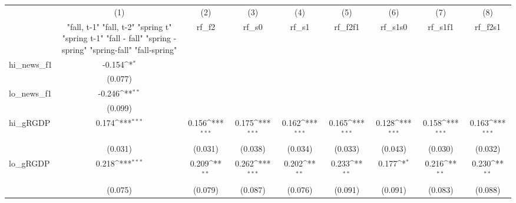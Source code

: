 {
\def\sym#1{\ifmmode^{#1}\else\(^{#1}\)\fi}
\begin{tabular}{l*{8}{c}}
\toprule
            &\multicolumn{1}{c}{(1)}&\multicolumn{1}{c}{(2)}&\multicolumn{1}{c}{(3)}&\multicolumn{1}{c}{(4)}&\multicolumn{1}{c}{(5)}&\multicolumn{1}{c}{(6)}&\multicolumn{1}{c}{(7)}&\multicolumn{1}{c}{(8)}\\
            &\multicolumn{1}{c}{  "fall, t-1" "fall, t-2" "spring t" "spring t-1"  "fall - fall" "spring - spring" "spring-fall" "fall-spring" }&\multicolumn{1}{c}{rf\_f2}&\multicolumn{1}{c}{rf\_s0}&\multicolumn{1}{c}{rf\_s1}&\multicolumn{1}{c}{rf\_f2f1}&\multicolumn{1}{c}{rf\_s1s0}&\multicolumn{1}{c}{rf\_s1f1}&\multicolumn{1}{c}{rf\_f2s1}\\
\midrule
hi\_news\_f1  &      -0.154\sym{*}  &                     &                     &                     &                     &                     &                     &                     \\
            &     (0.077)         &                     &                     &                     &                     &                     &                     &                     \\
\addlinespace
lo\_news\_f1  &      -0.246\sym{**} &                     &                     &                     &                     &                     &                     &                     \\
            &     (0.099)         &                     &                     &                     &                     &                     &                     &                     \\
\addlinespace
hi\_gRGDP    &       0.174\sym{***}&       0.156\sym{***}&       0.175\sym{***}&       0.162\sym{***}&       0.165\sym{***}&       0.128\sym{***}&       0.158\sym{***}&       0.163\sym{***}\\
            &     (0.031)         &     (0.031)         &     (0.038)         &     (0.034)         &     (0.033)         &     (0.043)         &     (0.030)         &     (0.032)         \\
\addlinespace
lo\_gRGDP    &       0.218\sym{***}&       0.209\sym{**} &       0.262\sym{***}&       0.202\sym{**} &       0.233\sym{**} &       0.177\sym{*}  &       0.216\sym{**} &       0.230\sym{**} \\
            &     (0.075)         &     (0.079)         &     (0.087)         &     (0.076)         &     (0.091)         &     (0.091)         &     (0.083)         &     (0.088)         \\

\end{tabular}}
